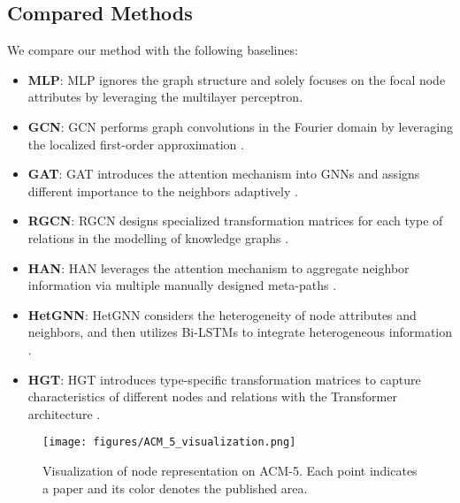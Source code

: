 \subsection{Compared Methods}
We compare our method with the following baselines:
\begin{itemize}
	\item \textbf{MLP}: 
    MLP ignores the graph structure and solely focuses on the focal node attributes by leveraging the multilayer perceptron.
    
    \item \textbf{GCN}:
    GCN performs graph convolutions in the Fourier domain by leveraging the localized first-order approximation \cite{DBLP:conf/iclr/KipfW17}.
    
    \item \textbf{GAT}:
    GAT introduces the attention mechanism into GNNs and assigns different importance to the neighbors adaptively \cite{DBLP:conf/iclr/VelickovicCCRLB18}. 
    
    \item \textbf{RGCN}:
    RGCN designs specialized transformation matrices for each type of relations in the modelling of knowledge graphs \cite{DBLP:conf/esws/SchlichtkrullKB18}.
    
    \item \textbf{HAN}:
    HAN leverages the attention mechanism to aggregate neighbor information via multiple manually designed meta-paths \cite{DBLP:conf/www/WangJSWYCY19}.
    
    \item \textbf{HetGNN}:
    HetGNN considers the heterogeneity of node attributes and neighbors, and then utilizes Bi-LSTMs to integrate heterogeneous information \cite{DBLP:conf/kdd/ZhangSHSC19}.
    
    \item \textbf{HGT}:
    HGT introduces type-specific transformation matrices to capture characteristics of different nodes and relations with the Transformer architecture \cite{DBLP:conf/www/HuDWS20}.
\end{itemize}

\begin{figure*}[t]
    \centering
    \texttt{[image: figures/ACM\_5\_visualization.png]}    
    \caption{Visualization of node representation on ACM-5. Each point indicates a paper and its color denotes the published area.}
    \label{fig:acm_5_node_visualization}
\end{figure*}

